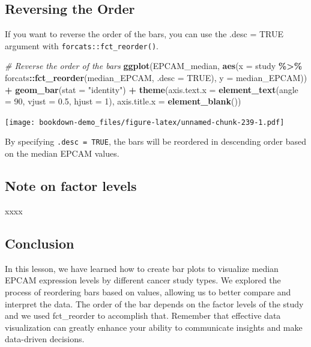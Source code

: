 \documentclass[
]{book}
\newenvironment{Shaded}{\begin{snugshade}}{\end{snugshade}}
\newcommand{\AttributeTok}[1]{\textcolor[rgb]{0.13,0.29,0.53}{#1}}
\newcommand{\CommentTok}[1]{\textcolor[rgb]{0.56,0.35,0.01}{\textit{#1}}}
\newcommand{\ConstantTok}[1]{\textcolor[rgb]{0.56,0.35,0.01}{#1}}
\newcommand{\DecValTok}[1]{\textcolor[rgb]{0.00,0.00,0.81}{#1}}
\newcommand{\FloatTok}[1]{\textcolor[rgb]{0.00,0.00,0.81}{#1}}
\newcommand{\FunctionTok}[1]{\textcolor[rgb]{0.13,0.29,0.53}{\textbf{#1}}}
\newcommand{\NormalTok}[1]{#1}
\newcommand{\SpecialCharTok}[1]{\textcolor[rgb]{0.81,0.36,0.00}{\textbf{#1}}}
\newcommand{\StringTok}[1]{\textcolor[rgb]{0.31,0.60,0.02}{#1}}
\begin{document}
\hypertarget{reversing-the-order}{%
\subsection{Reversing the Order}\label{reversing-the-order}}

If you want to reverse the order of the bars, you can use the .desc = TRUE argument with \texttt{forcats::fct\_reorder()}.

\begin{Shaded}
\begin{Highlighting}[]
\CommentTok{\# Reverse the order of the bars}
\FunctionTok{ggplot}\NormalTok{(EPCAM\_median, }\FunctionTok{aes}\NormalTok{(}\AttributeTok{x =}\NormalTok{ study }\SpecialCharTok{\%\textgreater{}\%}
\NormalTok{                           forcats}\SpecialCharTok{::}\FunctionTok{fct\_reorder}\NormalTok{(median\_EPCAM, }\AttributeTok{.desc =} \ConstantTok{TRUE}\NormalTok{), }
                         \AttributeTok{y =}\NormalTok{ median\_EPCAM)) }\SpecialCharTok{+}
  \FunctionTok{geom\_bar}\NormalTok{(}\AttributeTok{stat =} \StringTok{"identity"}\NormalTok{) }\SpecialCharTok{+}
  \FunctionTok{theme}\NormalTok{(}\AttributeTok{axis.text.x =} \FunctionTok{element\_text}\NormalTok{(}\AttributeTok{angle =} \DecValTok{90}\NormalTok{, }\AttributeTok{vjust =} \FloatTok{0.5}\NormalTok{, }\AttributeTok{hjust =} \DecValTok{1}\NormalTok{),}
        \AttributeTok{axis.title.x =} \FunctionTok{element\_blank}\NormalTok{())}
\end{Highlighting}
\end{Shaded}

\texttt{[image: bookdown-demo\_files/figure-latex/unnamed-chunk-239-1.pdf]}

By specifying \texttt{.desc\ =\ TRUE}, the bars will be reordered in descending order based on the median EPCAM values.

\hypertarget{note-on-factor-levels}{%
\subsection{Note on factor levels}\label{note-on-factor-levels}}

xxxx

\hypertarget{conclusion-25}{%
\subsection{Conclusion}\label{conclusion-25}}

In this lesson, we have learned how to create bar plots to visualize median EPCAM expression levels by different cancer study types. We explored the process of reordering bars based on values, allowing us to better compare and interpret the data. The order of the bar depends on the factor levels of the study and we used fct\_reorder to accomplish that. Remember that effective data visualization can greatly enhance your ability to communicate insights and make data-driven decisions.
\end{document}
